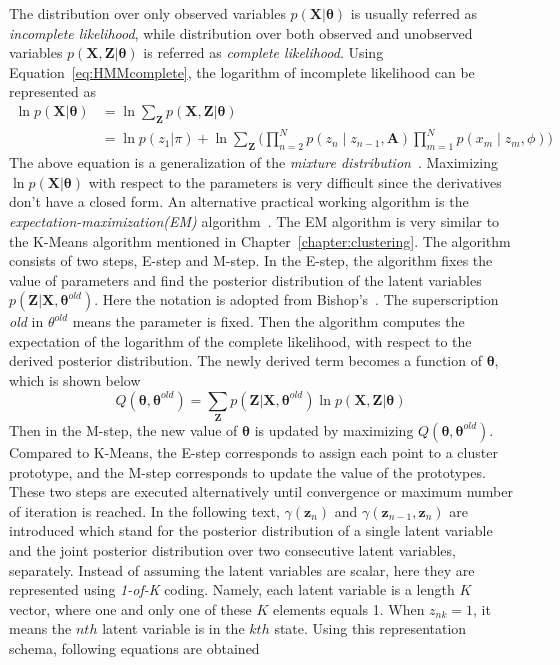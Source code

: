The distribution over only observed variables \(p(\mathbf{X} | \boldsymbol{\theta})\) is usually referred as \textit{incomplete likelihood}, while distribution over both observed and unobserved variables \(p(\mathbf{X}, \mathbf{Z} | \boldsymbol{\theta})\) is referred as \textit{complete likelihood}. Using Equation~\ref{eq:HMMcomplete}, the logarithm of incomplete likelihood can be represented as
\begin{equation}
	\begin{split}
		\ln p(\mathbf{X} | \boldsymbol{\theta}) & = \ln \sum_{\mathbf{Z}}p(\mathbf{X}, \mathbf{Z} | \boldsymbol{\theta}) \\
										   & = \ln p(z_1 | \pi)  + \ln \sum_{\mathbf{Z}}\Big( \prod_{n=2}^{N}p(z_n\mid z_{n-1}, \mathbf{A}) \prod_{m=1}^{N}p(x_m\mid z_m, \phi)\Big)
	\end{split}
\end{equation}
The above equation is a generalization of the \textit{mixture distribution}~\cite{PRML}. Maximizing $\ln p(\mathbf{X} | \boldsymbol{\theta})$ with respect to the parameters is very difficult since the derivatives don't have a closed form. An alternative practical working algorithm is the \textit{expectation-maximization(EM)} algorithm~\cite{dempster1977maximum}\cite{mclachlan2007algorithm}. The EM algorithm is very similar to the K-Means algorithm mentioned in Chapter~\ref{chapter:clustering}. The algorithm consists of two steps, E-step and M-step. In the E-step, the algorithm fixes the value of parameters and find the posterior distribution of the latent variables \(p(\mathbf{Z} | \mathbf{X}, \boldsymbol{\theta}^{old})\). Here the notation is adopted from Bishop's~\cite{PRML}. The superscription \textit{old} in \(\theta^{old}\) means the parameter is fixed. Then the algorithm computes the expectation of the logarithm of the complete likelihood, with respect to the derived posterior distribution. The newly derived term becomes a function of \(\boldsymbol{\theta}\), which is shown below
\begin{equation}
	Q(\boldsymbol{\theta}, \boldsymbol{\theta}^{old}) = \sum_{\mathbf{Z}}p(\mathbf{Z}| \mathbf{X}, \boldsymbol{\theta}^{old})\ln p(\mathbf{X}, \mathbf{Z} | \boldsymbol{\theta})
\end{equation}
Then in the M-step,  the new value of \(\boldsymbol{\theta}\) is updated by maximizing \(Q(\boldsymbol{\theta}, \boldsymbol{\theta}^{old})\). Compared to K-Means, the E-step corresponds to assign each point to a cluster prototype, and the M-step corresponds to update the value of the prototypes. These two steps are executed alternatively until convergence or maximum number of iteration is reached. In the following text, \(\gamma(\mathbf{z}_n)\) and \(\gamma(\mathbf{z}_{n-1}, \mathbf{z}_n)\) are introduced which stand for the posterior distribution of a single latent variable and the joint posterior distribution over two consecutive latent variables, separately. Instead of assuming the latent variables are scalar, here they are represented using \textit{1-of-K} coding. Namely, each latent variable is a length \(K\) vector, where one and only one of these \(K\) elements equals 1. When \(z_{nk} = 1\), it means the \(nth\) latent variable is in the \(kth\) state. Using this representation schema, following equations are obtained~\cite{PRML}
